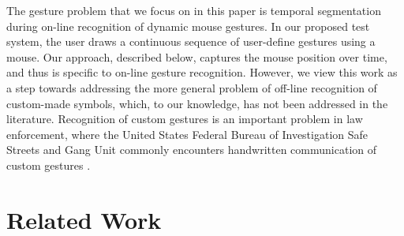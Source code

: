 \documentclass[twoside]{article}
\begin{document}
\begin{multicols}{2}
The gesture problem that we focus on in this paper is temporal segmentation
during on-line recognition of dynamic mouse gestures.
In our proposed test system, the user draws a continuous sequence of user-define gestures
using a mouse. Our approach, described below, captures the mouse position over
time, and thus is specific to on-line gesture recognition. However, we view this
work as a step towards addressing the more general problem of off-line
recognition of custom-made symbols, which, to our knowledge, has not been
addressed in the literature. Recognition of custom gestures is an important
problem in law enforcement, where the United States Federal Bureau of
Investigation Safe Streets and Gang Unit commonly encounters handwritten
communication of custom gestures \cite{lyddane_donald_united_2006}.




\section{Related Work}



\end{multicols}
\end{document}
